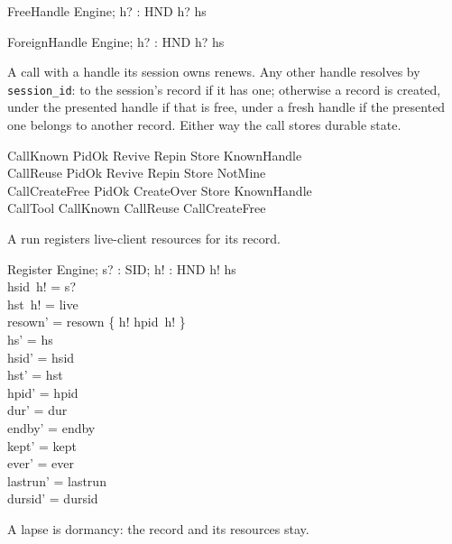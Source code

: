\documentclass[a4paper,10pt,fleqn]{article}
\begin{document}
\begin{schema}{FreeHandle}
  Engine; h? : HND
\where
  h? \notin hs
\end{schema}

\begin{schema}{ForeignHandle}
  Engine; h? : HND
\where
  h? \in hs
\end{schema}

A call with a handle its session owns renews.  Any other handle resolves by
\texttt{session\_id}: to the session's record if it has one; otherwise a record
is created, under the presented handle if that is free, under a fresh handle if
the presented one belongs to another record.  Either way the call stores
durable state.

\begin{zed}
  CallKnown  PidOk \land Revive \land Repin \land Store \land KnownHandle \\
  CallReuse  PidOk \land Revive \land Repin \land Store \land NotMine \\
  CallCreateFree  PidOk \land CreateOver \land Store \land KnownHandle \\
  CallTool  CallKnown \lor CallReuse \lor CallCreateFree
\end{zed}

A run registers live-client resources for its record.

\begin{schema}{Register}
  \Delta Engine; s? : SID; h! : HND
\where
  h! \in hs \\
  hsid~h! = s? \\
  hst~h! = live \\
  resown' = resown \oplus \{ h! \mapsto hpid~h! \} \\
  hs' = hs \\
  hsid' = hsid \\
  hst' = hst \\
  hpid' = hpid \\
  dur' = dur \\
  endby' = endby \\
  kept' = kept \\
  ever' = ever \\
  lastrun' = lastrun \\
  dursid' = dursid
\end{schema}

A lapse is dormancy: the record and its resources stay.
\end{document}

